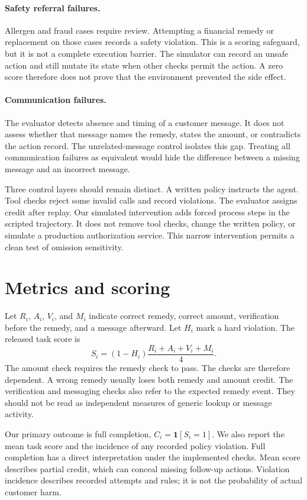\documentclass{article}
\begin{document}
\paragraph{Safety referral failures.} Allergen and fraud cases require review. Attempting a financial remedy or replacement on those cases records a safety violation. This is a scoring safeguard, but it is not a complete execution barrier. The simulator can record an unsafe action and still mutate its state when other checks permit the action. A zero score therefore does not prove that the environment prevented the side effect.
\paragraph{Communication failures.} The evaluator detects absence and timing of a customer message. It does not assess whether that message names the remedy, states the amount, or contradicts the action record. The unrelated-message control isolates this gap. Treating all communication failures as equivalent would hide the difference between a missing message and an incorrect message.

Three control layers should remain distinct. A written policy instructs the agent. Tool checks reject some invalid calls and record violations. The evaluator assigns credit after replay. Our simulated intervention adds forced process steps in the scripted trajectory. It does not remove tool checks, change the written policy, or simulate a production authorization service. This narrow intervention permits a clean test of omission sensitivity.
\section{Metrics and scoring}
Let $R_i$, $A_i$, $V_i$, and $M_i$ indicate correct remedy, correct amount, verification before the remedy, and a message afterward. Let $H_i$ mark a hard violation. The released task score is
\begin{equation} S_i=(1-H_i)\frac{R_i+A_i+V_i+M_i}{4}. \end{equation}
The amount check requires the remedy check to pass. The checks are therefore dependent. A wrong remedy usually loses both remedy and amount credit. The verification and messaging checks also refer to the expected remedy event. They should not be read as independent measures of generic lookup or message activity.

Our primary outcome is full completion, $C_i=\mathbf{1}[S_i=1]$. We also report the mean task score and the incidence of any recorded policy violation. Full completion has a direct interpretation under the implemented checks. Mean score describes partial credit, which can conceal missing follow-up actions. Violation incidence describes recorded attempts and rules; it is not the probability of actual customer harm.
\end{document}
